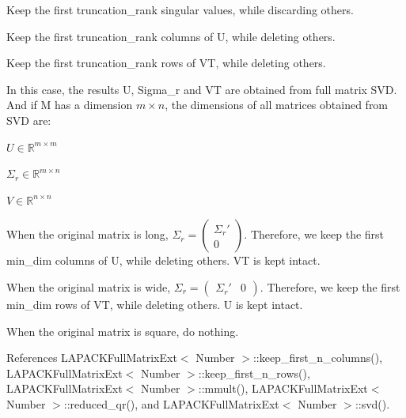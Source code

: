 Keep the first {\ttfamily truncation\+\_\+rank} singular values, while discarding others.

Keep the first {\ttfamily truncation\+\_\+rank} columns of {\ttfamily U}, while deleting others.

Keep the first {\ttfamily truncation\+\_\+rank} rows of {\ttfamily VT}, while deleting others.

In this case, the results {\ttfamily U}, {\ttfamily Sigma\+\_\+r} and {\ttfamily VT} are obtained from full matrix S\+VD. And if {\ttfamily M} has a dimension $m \times n$, the dimensions of all matrices obtained from S\+VD are\+:
\begin{DoxyItemize}
\item $U \in \mathbb{R}^{m \times m}$
\item $\Sigma_r \in \mathbb{R}^{m \times n}$
\item $V \in \mathbb{R}^{n \times n}$
\end{DoxyItemize}

When the original matrix is long, $\Sigma_r = \begin{pmatrix}\Sigma_r' \\ 0 \end{pmatrix}$. Therefore, we keep the first {\ttfamily min\+\_\+dim} columns of {\ttfamily U}, while deleting others. {\ttfamily VT} is kept intact.

When the original matrix is wide, $\Sigma_r = \begin{pmatrix} \Sigma_r' & 0 \end{pmatrix}$. Therefore, we keep the first {\ttfamily min\+\_\+dim} rows of {\ttfamily VT}, while deleting others. {\ttfamily U} is kept intact.

When the original matrix is square, do nothing.

References L\+A\+P\+A\+C\+K\+Full\+Matrix\+Ext$<$ Number $>$\+::keep\+\_\+first\+\_\+n\+\_\+columns(), L\+A\+P\+A\+C\+K\+Full\+Matrix\+Ext$<$ Number $>$\+::keep\+\_\+first\+\_\+n\+\_\+rows(), L\+A\+P\+A\+C\+K\+Full\+Matrix\+Ext$<$ Number $>$\+::mmult(), L\+A\+P\+A\+C\+K\+Full\+Matrix\+Ext$<$ Number $>$\+::reduced\+\_\+qr(), and L\+A\+P\+A\+C\+K\+Full\+Matrix\+Ext$<$ Number $>$\+::svd().

\mbox{\label{classLAPACKFullMatrixExt_a4b4bb2b69261608f54c42f329d272195}} 
